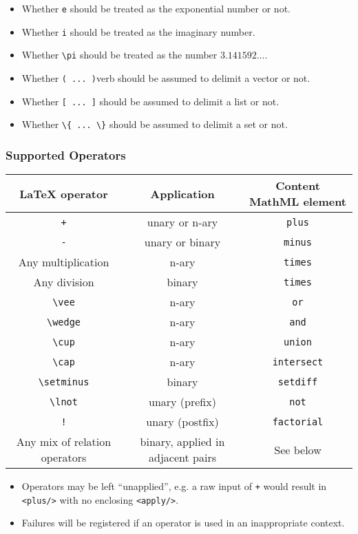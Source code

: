 \begin{itemize}
\item Whether \verb|e| should be treated as the exponential number or not.
\item Whether \verb|i| should be treated as the imaginary number.
\item Whether \verb|\pi| should be treated as the number $3.141592\ldots$.
\item Whether \verb|( ... )|verb should be assumed to delimit a vector or not.
\item Whether \verb|[ ... ]| should be assumed to delimit a list or not.
\item Whether \verb|\{ ... \}| should be assumed to delimit a set or not.
\end{itemize}

\subsubsection*{Supported Operators}

\begin{tabular}{|c|c|c|}
\hline
LaTeX operator & Application & Content MathML element \\
\hline
\verb|+| & unary or n-ary & \verb|plus| \\
\verb|-| & unary or binary & \verb|minus| \\
Any multiplication & n-ary & \verb|times| \\
Any division & binary & \verb|times| \\
\verb|\vee| & n-ary & \verb|or| \\
\verb|\wedge| & n-ary & \verb|and| \\
\verb|\cup| & n-ary & \verb|union| \\
\verb|\cap| & n-ary & \verb|intersect| \\
\verb|\setminus| & binary & \verb|setdiff| \\
\verb|\lnot| & unary (prefix) & \verb|not| \\
\verb|!| & unary (postfix) & \verb|factorial| \\
Any mix of relation operators & binary, applied in adjacent pairs & See below \\
\hline
\end{tabular}

\begin{itemize}
\item
Operators may be left ``unapplied'', e.g. a raw input of \verb|+|
would result in \verb|<plus/>| with no enclosing
\verb|<apply/>|.

\item
Failures will be registered if an operator is used in an inappropriate
context.
\end{itemize}

